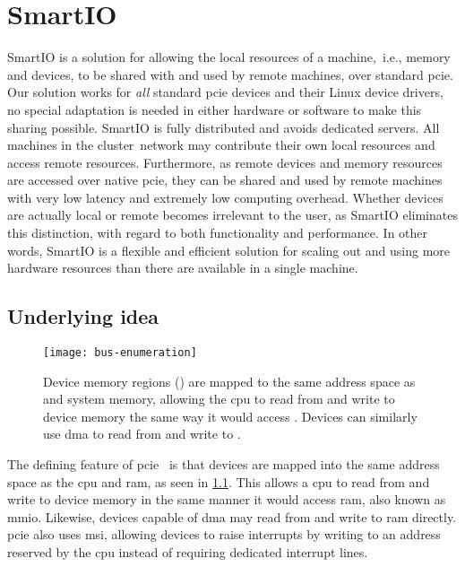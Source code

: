 \chapter{SmartIO}\label{chapter:smartio}
SmartIO is a solution for allowing the local resources of a machine,~i.e., memory and devices, to be shared with and used by remote machines, over standard \gls{pcie}.
%
Our solution works for \emph{all} standard \gls{pcie} devices and their Linux device drivers, no special adaptation is needed in either hardware or software to make this sharing possible.
%
SmartIO is fully distributed and avoids dedicated servers.
%
All machines in the cluster~network may contribute their own local resources and access remote resources.
%
Furthermore, as remote devices and memory resources are accessed over native \gls{pcie}, they can be shared and used by remote machines with very low latency and extremely low computing overhead.
%
Whether devices are actually local or remote becomes irrelevant to the user, as SmartIO eliminates this distinction, with regard to both functionality and performance.
%
In other words, SmartIO is a flexible and efficient solution for scaling out and using more hardware resources than there are available in a single machine.


\section{Underlying idea}\label{sec:idea}
\begin{figure}
    \centering
    \texttt{[image: bus-enumeration]}
    \caption[Devices are mapped to the same address space as the  and system memory]
    {Device memory regions () are mapped to the same address space as  and system memory, allowing
    the \gls{cpu} to read from and write to device memory the same way it would access . Devices can similarly use \gls{dma} to read from and write to .}
    \label{fig:bus-enumeration}
\end{figure}
The defining feature of \gls{pcie}~\cite{spec:PCIe} is that devices are mapped into the same address space as the \gls{cpu} and \gls{ram}, as seen in \cref{fig:bus-enumeration}.
%
This allows a \gls{cpu} to read from and write to device memory in the same manner it would access \gls{ram}, also known as \gls{mmio}.
%
Likewise, devices capable of \gls{dma} may read from and write to \gls{ram} directly.
%
\Gls{pcie} also uses \gls{msi}, allowing devices to raise interrupts by writing to an address reserved by the \gls{cpu} instead of requiring dedicated interrupt lines.



